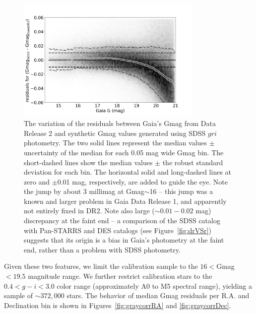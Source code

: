 \begin{figure}[th!]
    \centering\includegraphics[width=9cm]{figures/GmagCorrectionTest_Gmag_Hess.png} 
\caption{The variation of the residuals between Gaia's Gmag from Data Release 2
and synthetic Gmag values generated using SDSS $gri$ photometry. The two solid 
lines represent the median values $\pm$ uncertainty of the median for each
0.05 mag wide Gmag bin. The short-dashed lines show the median values $\pm$ 
the robust standard deviation for each bin. The horizontal solid and long-dashed 
lines at zero and $\pm$0.01 mag, respectively, are added to guide the eye.
Note the jump by about 3 millimag at Gmag$\sim$16 -- this jump was a known and 
larger problem in Gaia Data Release 1, and apparently not entirely fixed in DR2. 
Note also large ($\sim0.01-0.02$ mag) discrepancy at the faint end -- a comparison 
of the SDSS catalog with Pan-STARRS and DES catalogs (see Figure~\ref{fig:drVSr}) 
suggests that its origin is a bias in Gaia's photometry at the faint end, rather than 
a problem with SDSS photometry.}
\label{fig:gaiaJump}
\end{figure}


Given these two features, we limit the calibration sample to the $16<$Gmag$<19.5$
magnitude range. We further restrict calibration stars to the $0.4 < g-i < 3.0$ color 
range (approximately A0 to M5 spectral range), yielding a sample of $\sim372,000$ stars. 
The behavior of median Gmag residuals per R.A. and Declination bin is shown in 
Figures~\ref{fig:graycorrRA} and \ref{fig:graycorrDec}. 


